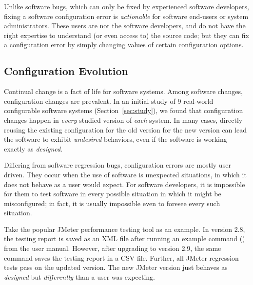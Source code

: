 Unlike software bugs,
which can only be fixed by experienced software developers, fixing a software
configuration error is \textit{actionable} for software end-users
or system administrators. These users are not the software developers,
and do not have the right expertise to understand (or even access to)
the source code;  but they can fix a configuration error by simply changing
values of certain configuration options.


\subsection{Configuration Evolution}
\label{sec:evolerror}

Continual change is a fact of life for software systems.
Among software changes, configuration changes are prevalent.
In an initial study of 9 real-world configurable software
systems (Section~\ref{sec:study}),
we found that configuration changes happen in \textit{every} studied
version of \textit{each} system. In many 
cases, directly reusing the existing configuration
for the old version for the new
version can lead the software to exhibit \textit{undesired} behaviors,
even if the software is working exactly as \textit{designed}.




Differing from software regression bugs, configuration errors are mostly user driven.
They occur when the use of software is unexpected
situations, in which it does not behave as a user would expect.
For software developers,
it is impossible for them to test software in every possible
situation in which it might be misconfigured; in fact, it is usually
impossible even to foresee every such situation. 


Take the popular JMeter performance testing tool as an example.
In version 2.8, the testing report is saved as an XML
file after running an example command ()
from the user manual.
However, after upgrading to version 2.9, 
the same command saves the testing report
in a CSV file. Further, all JMeter regression tests pass 
on the updated version.  The new JMeter version
just behaves as \textit{designed} but \textit{differently}
than a user was expecting.


